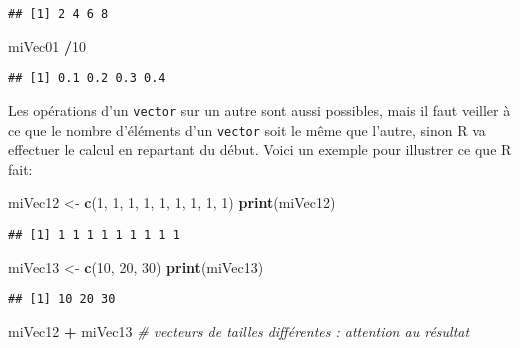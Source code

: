 \documentclass[]{book}
\newenvironment{Shaded}{\begin{snugshade}}{\end{snugshade}}
\newcommand{\KeywordTok}[1]{\textcolor[rgb]{0.13,0.29,0.53}{\textbf{#1}}}
\newcommand{\DecValTok}[1]{\textcolor[rgb]{0.00,0.00,0.81}{#1}}
\newcommand{\StringTok}[1]{\textcolor[rgb]{0.31,0.60,0.02}{#1}}
\newcommand{\CommentTok}[1]{\textcolor[rgb]{0.56,0.35,0.01}{\textit{#1}}}
\newcommand{\OperatorTok}[1]{\textcolor[rgb]{0.81,0.36,0.00}{\textbf{#1}}}
\newcommand{\NormalTok}[1]{#1}
\theoremstyle{definition}
\theoremstyle{definition}
\theoremstyle{definition}
\theoremstyle{remark}
\begin{document}
\begin{verbatim}
## [1] 2 4 6 8
\end{verbatim}

\begin{Shaded}
\begin{Highlighting}[]
\NormalTok{miVec01 }\OperatorTok{/}\DecValTok{10}
\end{Highlighting}
\end{Shaded}

\begin{verbatim}
## [1] 0.1 0.2 0.3 0.4
\end{verbatim}

Les opérations d'un \texttt{vector} sur un autre sont aussi possibles,
mais il faut veiller à ce que le nombre d'éléments d'un \texttt{vector}
soit le même que l'autre, sinon R va effectuer le calcul en repartant du
début. Voici un exemple pour illustrer ce que R fait:

\begin{Shaded}
\begin{Highlighting}[]
\NormalTok{miVec12 <-}\StringTok{ }\KeywordTok{c}\NormalTok{(}\DecValTok{1}\NormalTok{, }\DecValTok{1}\NormalTok{, }\DecValTok{1}\NormalTok{, }\DecValTok{1}\NormalTok{, }\DecValTok{1}\NormalTok{, }\DecValTok{1}\NormalTok{, }\DecValTok{1}\NormalTok{, }\DecValTok{1}\NormalTok{, }\DecValTok{1}\NormalTok{)}
\KeywordTok{print}\NormalTok{(miVec12)}
\end{Highlighting}
\end{Shaded}

\begin{verbatim}
## [1] 1 1 1 1 1 1 1 1 1
\end{verbatim}

\begin{Shaded}
\begin{Highlighting}[]
\NormalTok{miVec13 <-}\StringTok{ }\KeywordTok{c}\NormalTok{(}\DecValTok{10}\NormalTok{, }\DecValTok{20}\NormalTok{, }\DecValTok{30}\NormalTok{)}
\KeywordTok{print}\NormalTok{(miVec13)}
\end{Highlighting}
\end{Shaded}

\begin{verbatim}
## [1] 10 20 30
\end{verbatim}

\begin{Shaded}
\begin{Highlighting}[]
\NormalTok{miVec12 }\OperatorTok{+}\StringTok{ }\NormalTok{miVec13 }\CommentTok{# vecteurs de tailles différentes : attention au résultat}
\end{Highlighting}
\end{Shaded}
\end{document}
